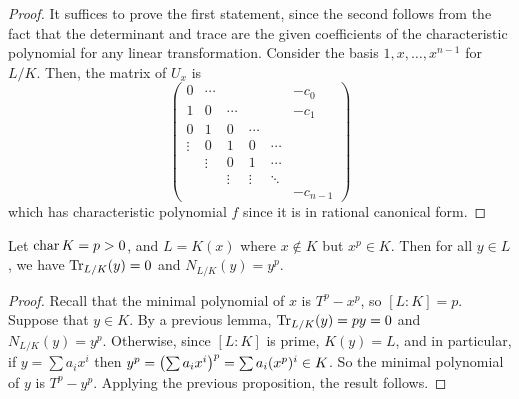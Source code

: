 \begin{proof}
	It suffices to prove the first statement, since the second follows from the fact that the determinant and trace are the given coefficients of the characteristic polynomial for any linear transformation.
	Consider the basis \( 1, x, \dots, x^{n-1} \) for \( L / K \).
	Then, the matrix of \( U_x \) is
	\[ \begin{pmatrix}
		0 & \cdots & & & & -c_0 \\
		1 & 0 & \cdots & & & -c_1 \\
		0 & 1 & 0 & \cdots \\
		\vdots & 0 & 1 & 0 & \cdots \\
		& \vdots & 0 & 1 & \cdots \\
		& & \vdots & \vdots & \ddots \\
		& & & & & -c_{n-1}
	\end{pmatrix} \]
	which has characteristic polynomial \( f \) since it is in rational canonical form.
\end{proof}
\begin{corollary}
	Let \( \operatorname{char} K = p > 0 \), and \( L = K(x) \) where \( x \not\in K \) but \( x^p \in K \).
	Then for all \( y \in L \), we have \( \Tr_{L/K}(y) = 0 \) and \( N_{L/K}(y) = y^p \).
\end{corollary}
\begin{proof}
	Recall that the minimal polynomial of \( x \) is \( T^p - x^p \), so \( [L : K] = p \).
	Suppose that \( y \in K \).
	By a previous lemma, \( \Tr_{L/K}(y) = py = 0 \) and \( N_{L/K}(y) = y^p \).
	Otherwise, since \( [L:K] \) is prime, \( K(y) = L \), and in particular, if \( y = \sum a_i x^i \) then \( y^p = \qty(\sum a_i x^i)^p = \sum a_i (x^p)^i \in K \).
	So the minimal polynomial of \( y \) is \( T^p - y^p \).
	Applying the previous proposition, the result follows.
\end{proof}

